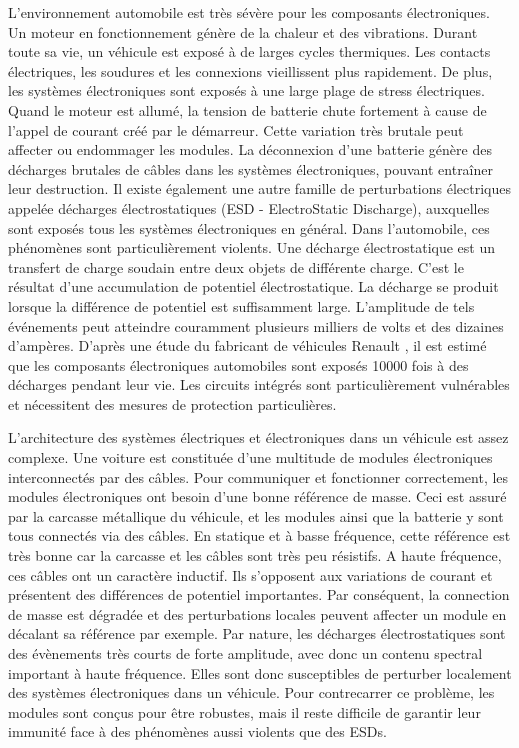 L'environnement automobile est très sévère pour les composants électroniques.
Un moteur en fonctionnement génère de la chaleur et des vibrations.
Durant toute sa vie, un véhicule est exposé à de larges cycles thermiques.
Les contacts électriques, les soudures et les connexions vieillissent plus rapidement.
De plus, les systèmes électroniques sont exposés à une large plage de stress électriques.
Quand le moteur est allumé, la tension de batterie chute fortement à cause de l'appel de courant créé par le démarreur.
Cette variation très brutale peut affecter ou endommager les modules.
La déconnexion d'une batterie génère des décharges brutales de câbles dans les systèmes électroniques, pouvant entraîner leur destruction.
Il existe également une autre famille de perturbations électriques appelée décharges électrostatiques (ESD - ElectroStatic Discharge), auxquelles sont exposés tous les systèmes électroniques en général.
Dans l'automobile, ces phénomènes sont particulièrement violents.
Une décharge électrostatique est un transfert de charge soudain entre deux objets de différente charge.
C'est le résultat d'une accumulation de potentiel électrostatique.
La décharge se produit lorsque la différence de potentiel est suffisamment large.
L'amplitude de tels événements peut atteindre couramment plusieurs milliers de volts et des dizaines d'ampères.
D'après une étude du fabricant de véhicules Renault \cite{Renault-esd}, il est estimé que les composants électroniques automobiles sont exposés 10000 fois à des décharges pendant leur vie.
Les circuits intégrés sont particulièrement vulnérables \cite{impactESDsemiconductors} et nécessitent des mesures de protection particulières.

L'architecture des systèmes électriques et électroniques dans un véhicule est assez complexe.
Une voiture est constituée d'une multitude de modules électroniques interconnectés par des câbles.
Pour communiquer et fonctionner correctement, les modules électroniques ont besoin d'une bonne référence de masse.
Ceci est assuré par la carcasse métallique du véhicule, et les modules ainsi que la batterie y sont tous connectés via des câbles.
En statique et à basse fréquence, cette référence est très bonne car la carcasse et les câbles sont très peu résistifs.
A haute fréquence, ces câbles ont un caractère inductif.
Ils s'opposent aux variations de courant et présentent des différences de potentiel importantes.
Par conséquent, la connection de masse est dégradée et des perturbations locales peuvent affecter un module en décalant sa référence par exemple.
Par nature, les décharges électrostatiques sont des évènements très courts de forte amplitude, avec donc un contenu spectral important à haute fréquence.
Elles sont donc susceptibles de perturber localement des systèmes électroniques dans un véhicule.
Pour contrecarrer ce problème, les modules sont conçus pour être robustes, mais il reste difficile de garantir leur immunité face à des phénomènes aussi violents que des ESDs.

